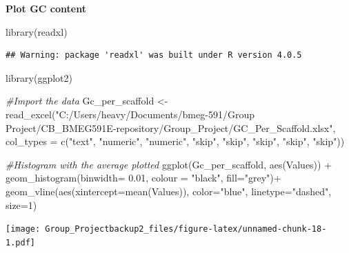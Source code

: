 \documentclass[
]{article}
\newenvironment{Shaded}{\begin{snugshade}}{\end{snugshade}}
\newcommand{\AttributeTok}[1]{\textcolor[rgb]{0.77,0.63,0.00}{#1}}
\newcommand{\CommentTok}[1]{\textcolor[rgb]{0.56,0.35,0.01}{\textit{#1}}}
\newcommand{\DecValTok}[1]{\textcolor[rgb]{0.00,0.00,0.81}{#1}}
\newcommand{\FloatTok}[1]{\textcolor[rgb]{0.00,0.00,0.81}{#1}}
\newcommand{\FunctionTok}[1]{\textcolor[rgb]{0.00,0.00,0.00}{#1}}
\newcommand{\NormalTok}[1]{#1}
\newcommand{\OtherTok}[1]{\textcolor[rgb]{0.56,0.35,0.01}{#1}}
\newcommand{\SpecialCharTok}[1]{\textcolor[rgb]{0.00,0.00,0.00}{#1}}
\newcommand{\StringTok}[1]{\textcolor[rgb]{0.31,0.60,0.02}{#1}}
\begin{document}
\textbf{Plot GC content}

\begin{Shaded}
\begin{Highlighting}[]
\FunctionTok{library}\NormalTok{(readxl)}
\end{Highlighting}
\end{Shaded}

\begin{verbatim}
## Warning: package 'readxl' was built under R version 4.0.5
\end{verbatim}

\begin{Shaded}
\begin{Highlighting}[]
\FunctionTok{library}\NormalTok{(ggplot2)}

\CommentTok{\#Import the data}
\NormalTok{Gc\_per\_scaffold }\OtherTok{\textless{}{-}} \FunctionTok{read\_excel}\NormalTok{(}\StringTok{"C:/Users/heavy/Documents/bmeg{-}591/Group Project/CB\_BMEG591E{-}repository/Group\_Project/GC\_Per\_Scaffold.xlsx"}\NormalTok{,}
                              \AttributeTok{col\_types =} \FunctionTok{c}\NormalTok{(}\StringTok{"text"}\NormalTok{, }\StringTok{"numeric"}\NormalTok{, }\StringTok{"numeric"}\NormalTok{, }\StringTok{"skip"}\NormalTok{, }\StringTok{"skip"}\NormalTok{, }\StringTok{"skip"}\NormalTok{, }\StringTok{"skip"}\NormalTok{, }\StringTok{"skip"}\NormalTok{))}



\CommentTok{\#Histogram with the average plotted}
\FunctionTok{ggplot}\NormalTok{(Gc\_per\_scaffold, }\FunctionTok{aes}\NormalTok{(Values)) }\SpecialCharTok{+}
  \FunctionTok{geom\_histogram}\NormalTok{(}\AttributeTok{binwidth=} \FloatTok{0.01}\NormalTok{, }\AttributeTok{colour =} \StringTok{"black"}\NormalTok{, }\AttributeTok{fill=}\StringTok{"grey"}\NormalTok{)}\SpecialCharTok{+}
  \FunctionTok{geom\_vline}\NormalTok{(}\FunctionTok{aes}\NormalTok{(}\AttributeTok{xintercept=}\FunctionTok{mean}\NormalTok{(Values)),}
             \AttributeTok{color=}\StringTok{"blue"}\NormalTok{, }\AttributeTok{linetype=}\StringTok{"dashed"}\NormalTok{, }\AttributeTok{size=}\DecValTok{1}\NormalTok{)}
\end{Highlighting}
\end{Shaded}

\texttt{[image: Group\_Projectbackup2\_files/figure-latex/unnamed-chunk-18-1.pdf]}
\end{document}

